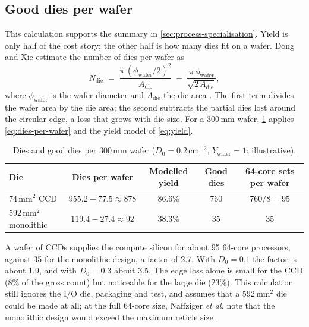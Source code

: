 \subsection{Good dies per wafer}
\label{app:dies-per-wafer}
This calculation supports the summary in \cref{sec:process-specialisation}. Yield is only half of the cost story; the other half is how many dies fit on a wafer. Dong and Xie estimate the number of dies per wafer as
\begin{equation}
  N_{\mathrm{die}} \;=\; \frac{\pi\,(\phi_{\mathrm{wafer}}/2)^2}{A_{\mathrm{die}}} \;-\; \frac{\pi\,\phi_{\mathrm{wafer}}}{\sqrt{2\,A_{\mathrm{die}}}},
  \label{eq:dies-per-wafer}
\end{equation}
where $\phi_{\mathrm{wafer}}$ is the wafer diameter and $A_{\mathrm{die}}$ the die area \cite[Eq.~14]{dongSystemlevelCostAnalysis2009}. The first term divides the wafer area by the die area; the second subtracts the partial dies lost around the circular edge, a loss that grows with die size. For a 300\,mm wafer, \cref{tab:dies-per-wafer} applies \cref{eq:dies-per-wafer} and the yield model of \cref{eq:yield}.

\begin{table}[htbp]
  \centering
  \caption[Dies and good dies per 300\,mm wafer]{Dies and good dies per 300\,mm wafer ($D_0 = 0.2$\,cm$^{-2}$, $Y_{\mathrm{wafer}} = 1$; illustrative).}
  \label{tab:dies-per-wafer}
  \small
  \begin{tabular}{@{}lcccc@{}}
    \toprule
    \textbf{Die} & \textbf{Dies per wafer} & \textbf{Modelled yield} & \textbf{Good dies} & \textbf{64-core sets per wafer} \\
    \midrule
    74\,mm$^2$ CCD & $955.2 - 77.5 \approx 878$ & 86.6\% & 760 & $760/8 = 95$ \\
    592\,mm$^2$ monolithic & $119.4 - 27.4 \approx 92$ & 38.3\% & 35 & 35 \\
    \bottomrule
  \end{tabular}
\end{table}

A wafer of CCDs supplies the compute silicon for about 95 64-core processors, against 35 for the monolithic design, a factor of 2.7. With $D_0 = 0.1$ the factor is about 1.9, and with $D_0 = 0.3$ about 3.5. The edge loss alone is small for the CCD (8\% of the gross count) but noticeable for the large die (23\%). This calculation still ignores the I/O die, packaging and test, and assumes that a 592\,mm$^2$ die could be made at all; at the full 64-core size, Naffziger \emph{et al.} note that the monolithic design would exceed the maximum reticle size \cite{naffziger2020chiplet}.
\clearpage
